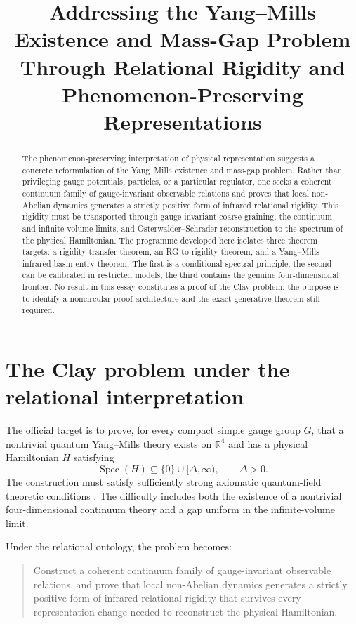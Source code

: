 \documentclass[11pt]{article}
\title{Addressing the Yang--Mills Existence and Mass-Gap Problem\\
\large Through Relational Rigidity and Phenomenon-Preserving Representations}
\author{}
\date{}
\theoremstyle{remark}
\newcommand{\Spec}{\operatorname{Spec}}
\newcommand{\R}{\mathbb{R}}
\begin{document}
\maketitle

\begin{abstract}
The phenomenon-preserving interpretation of physical representation suggests a
concrete reformulation of the Yang--Mills existence and mass-gap problem.
Rather than privileging gauge potentials, particles, or a particular regulator,
one seeks a coherent continuum family of gauge-invariant observable relations
and proves that local non-Abelian dynamics generates a strictly positive form
of infrared relational rigidity.  This rigidity must be transported through
gauge-invariant coarse-graining, the continuum and infinite-volume limits, and
Osterwalder--Schrader reconstruction to the spectrum of the physical
Hamiltonian.  The programme developed here isolates three theorem targets: a
rigidity-transfer theorem, an RG-to-rigidity theorem, and a Yang--Mills
infrared-basin-entry theorem.  The first is a conditional spectral principle;
the second can be calibrated in restricted models; the third contains the
genuine four-dimensional frontier.  No result in this essay constitutes a
proof of the Clay problem; the purpose is to identify a noncircular proof
architecture and the exact generative theorem still required.
\end{abstract}

\section{The Clay problem under the relational interpretation}

The official target is to prove, for every compact simple gauge group $G$, that
a nontrivial quantum Yang--Mills theory exists on $\R^4$ and has a physical
Hamiltonian $H$ satisfying
\begin{equation}
  \Spec(H)\subseteq\{0\}\cup[\Delta,\infty),
  \qquad \Delta>0.
  \label{eq:clay-target}
\end{equation}
The construction must satisfy sufficiently strong axiomatic quantum-field
theoretic conditions \cite{jaffe-witten}.  The difficulty includes both the
existence of a nontrivial four-dimensional continuum theory and a gap uniform
in the infinite-volume limit.

Under the relational ontology, the problem becomes:
\begin{quote}
Construct a coherent continuum family of gauge-invariant observable relations,
and prove that local non-Abelian dynamics generates a strictly positive form of
infrared relational rigidity that survives every representation change needed
to reconstruct the physical Hamiltonian.
\end{quote}
\end{document}
